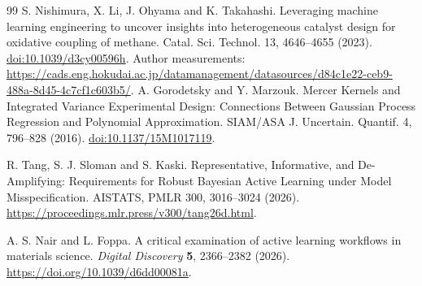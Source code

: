\begin{thebibliography}{99}
 S. Nishimura, X. Li, J. Ohyama and K. Takahashi. Leveraging machine learning engineering to uncover insights into heterogeneous catalyst design for oxidative coupling of methane. Catal. Sci. Technol. 13, 4646--4655 (2023). \href{https://doi.org/10.1039/d3cy00596h}{doi:10.1039/d3cy00596h}. Author measurements: \url{https://cads.eng.hokudai.ac.jp/datamanagement/datasources/d84c1e22-ceb9-488a-8d45-4c7cf1c603b5/}.
 A. Gorodetsky and Y. Marzouk. Mercer Kernels and Integrated Variance Experimental Design: Connections Between Gaussian Process Regression and Polynomial Approximation. SIAM/ASA J. Uncertain. Quantif. 4, 796--828 (2016). \href{https://doi.org/10.1137/15M1017119}{doi:10.1137/15M1017119}.


 R. Tang, S. J. Sloman and S. Kaski. Representative, Informative, and De-Amplifying: Requirements for Robust Bayesian Active Learning under Model Misspecification. AISTATS, PMLR 300, 3016--3024 (2026). \url{https://proceedings.mlr.press/v300/tang26d.html}.

 A. S. Nair and L. Foppa. A critical examination of active learning workflows in materials science. \emph{Digital Discovery} \textbf{5}, 2366--2382 (2026). \url{https://doi.org/10.1039/d6dd00081a}.

\end{thebibliography}

